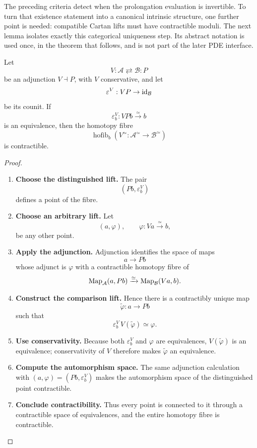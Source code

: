 The preceding criteria detect when the prolongation evaluation is invertible.
To turn that existence statement into a canonical intrinsic structure, one
further point is needed: compatible Cartan lifts must have contractible moduli.
The next lemma isolates exactly this categorical uniqueness step. Its abstract
notation is used once, in the theorem that follows, and is not part of the
later PDE interface.

\begin{lemma}
\label{lem:contractible-adjunction-lift}
Let
\[
  V:\mathcal A\rightleftarrows\mathcal B:P
\]
be an adjunction \(V\dashv P\), with \(V\) conservative, and let
\[
  \varepsilon^V:VP\to\operatorname{id}_{\mathcal B}
\]
be its counit. If
\[
  \varepsilon^V_b:VPb\xrightarrow{\simeq}b
\]
is an equivalence, then the homotopy fibre
\[
  \operatorname{hofib}_{b}
  \left(
    V^\simeq:\mathcal A^\simeq\to\mathcal B^\simeq
  \right)
\]
is contractible.
\end{lemma}

\begin{proof}
\leavevmode
\begin{enumerate}[label=\textup{(\arabic*)}]
    \item \textbf{Choose the distinguished lift.}
The pair
\[
  (Pb,\varepsilon^V_b)
\]
defines a point of the fibre.

    \item \textbf{Choose an arbitrary lift.}
Let
\[
  (a,\varphi),
  \qquad
  \varphi:Va\xrightarrow{\simeq}b,
\]
be any other point.

    \item \textbf{Apply the adjunction.}
Adjunction identifies the space of maps
\[
  a\longrightarrow Pb
\]
whose adjunct is \(\varphi\) with a contractible homotopy fibre of
\[
  \operatorname{Map}_{\mathcal A}(a,Pb)
  \xrightarrow{\simeq}
  \operatorname{Map}_{\mathcal B}(Va,b).
\]

    \item \textbf{Construct the comparison lift.}
Hence there is a contractibly unique map
\[
  \widetilde\varphi:a\to Pb
\]
such that
\[
  \varepsilon^V_b\,V(\widetilde\varphi)\simeq\varphi.
\]

    \item \textbf{Use conservativity.}
Because both \(\varepsilon^V_b\) and \(\varphi\) are equivalences,
\(V(\widetilde\varphi)\) is an equivalence; conservativity of \(V\) therefore
makes \(\widetilde\varphi\) an equivalence.

    \item \textbf{Compute the automorphism space.}
The same adjunction calculation with
\((a,\varphi)=(Pb,\varepsilon^V_b)\) makes the automorphism space of the
distinguished point contractible.

    \item \textbf{Conclude contractibility.}
Thus every point is connected to it through
a contractible space of equivalences, and the entire homotopy fibre is
contractible.
\end{enumerate}
\end{proof}

